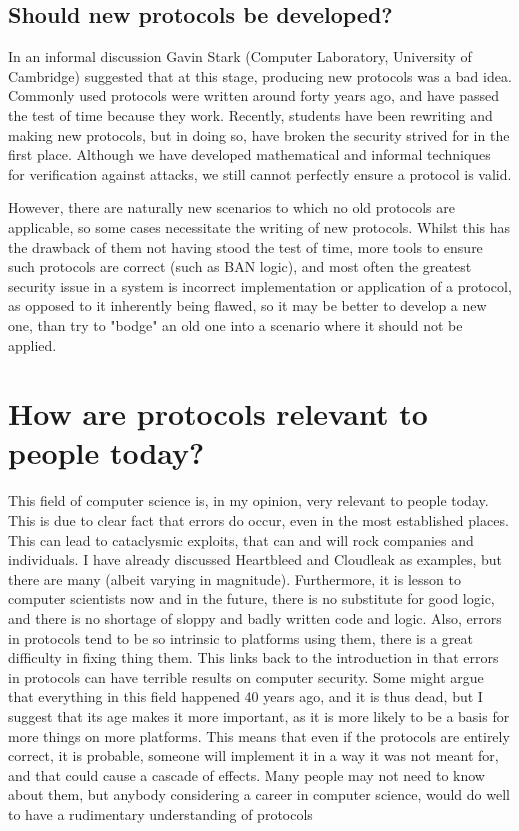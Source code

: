 \documentclass{article}
\begin{document}
\subsection{Should new protocols be developed?}
In an informal discussion Gavin Stark (Computer Laboratory, University of
Cambridge) suggested that at this stage, producing new protocols was a bad idea.
Commonly used protocols were written around forty years ago, and have passed the
test of time because they work. Recently, students have been rewriting and
making new protocols, but in doing so, have broken the security strived for in
the first place. Although we have developed mathematical and informal techniques
for verification against attacks, we still cannot perfectly ensure a protocol is
valid.

However, there are naturally new scenarios to which no old protocols are
applicable, so some cases necessitate the writing of new protocols. Whilst this
has the drawback of them not having stood the test of time, more tools to ensure
such protocols are correct (such as BAN logic), and most often the greatest
security issue in a system is incorrect implementation or application of a
protocol, as opposed to it inherently being flawed, so it may be better to
develop a new one, than try to "bodge" an old one into a scenario where it
should not be applied.

\section{How are protocols relevant to people today?}
This field of computer science is, in my opinion, very relevant to people today.
This is due to clear fact that errors do occur, even in the most established
places. This can lead to cataclysmic exploits, that can and will rock companies
and individuals. I have already discussed Heartbleed and Cloudleak as examples,
but there are many (albeit varying in magnitude). Furthermore, it is lesson to
computer scientists now and in the future, there is no substitute for good
logic, and there is no shortage of sloppy and badly written code and logic.
Also, errors in protocols tend to be so intrinsic to platforms using them, there
is a great difficulty in fixing thing them. This links back to the introduction
in that errors in protocols can have terrible results on computer security. Some
might argue that everything in this field happened 40 years ago, and it is thus
dead, but I suggest that its age makes it more important, as it is more likely
to be a basis for more things on more platforms. This means that even if the
protocols are entirely correct, it is probable, someone will implement it in a
way it was not meant for, and that could cause a cascade of effects. Many people
may not need to know about them, but anybody considering a career in computer
science, would do well to have a rudimentary understanding of protocols
\end{document}
